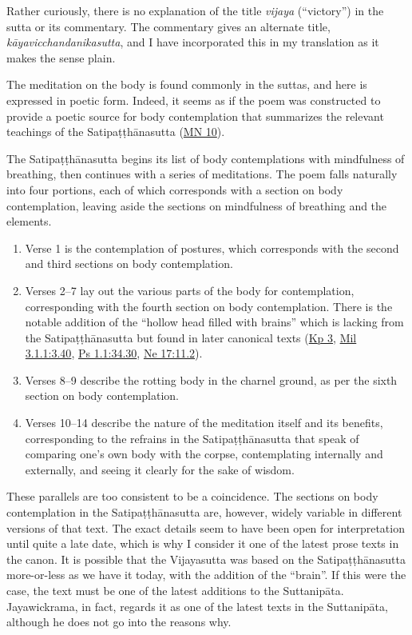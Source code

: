 \documentclass[12pt,openany]{book}%
\begin{document}
Rather curiously, there is no explanation of the title \textit{vijaya} (“victory”) in the sutta or its commentary. The commentary gives an alternate title, \textit{\textsanskrit{kāyavicchandanikasutta}}, and I have incorporated this in my translation as it makes the sense plain.

The meditation on the body is found commonly in the suttas, and here is expressed in poetic form. Indeed, it seems as if the poem was constructed to provide a poetic source for body contemplation that summarizes the relevant teachings of the \textsanskrit{Satipaṭṭhānasutta} (\href{https://suttacentral.net/mn10/en/sujato}{MN 10}).

The \textsanskrit{Satipaṭṭhānasutta} begins its list of body contemplations with mindfulness of breathing, then continues with a series of meditations. The poem falls naturally into four portions, each of which corresponds with a section on body contemplation, leaving aside the sections on mindfulness of breathing and the elements.

\begin{enumerate}%
\item Verse 1 is the contemplation of postures, which corresponds with the second and third sections on body contemplation.%
\item Verses 2–7 lay out the various parts of the body for contemplation, corresponding with the fourth section on body contemplation. There is the notable addition of the “hollow head filled with brains” which is lacking from the \textsanskrit{Satipaṭṭhānasutta} but found in later canonical texts (\href{https://suttacentral.net/kp3}{Kp 3}, \href{https://suttacentral.net/mil3.1.1}{Mil 3.1.1:3.40}, \href{https://suttacentral.net/ps1.1}{Ps 1.1:34.30}, \href{https://suttacentral.net/ne17}{Ne 17:11.2}).%
\item Verses 8–9 describe the rotting body in the charnel ground, as per the sixth section on body contemplation.%
\item Verses 10–14 describe the nature of the meditation itself and its benefits, corresponding to the refrains in the \textsanskrit{Satipaṭṭhānasutta} that speak of comparing one’s own body with the corpse, contemplating internally and externally, and seeing it clearly for the sake of wisdom.%
\end{enumerate}

These parallels are too consistent to be a coincidence. The sections on body contemplation in the \textsanskrit{Satipaṭṭhānasutta} are, however, widely variable in different versions of that text. The exact details seem to have been open for interpretation until quite a late date, which is why I consider it one of the latest prose texts in the canon. It is possible that the Vijayasutta was based on the \textsanskrit{Satipaṭṭhānasutta} more-or-less as we have it today, with the addition of the “brain”. If this were the case, the text must be one of the latest additions to the \textsanskrit{Suttanipāta}. Jayawickrama, in fact, regards it as one of the latest texts in the \textsanskrit{Suttanipāta}, although he does not go into the reasons why.
\end{document}

